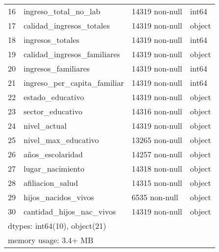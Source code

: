 \documentclass[a4paper]{article}
\begin{document}
\begin{table}[H]
\begin{center}
\begin{tabular}{clll}
    16 & ingreso\_total\_no\_lab        & 14319 non-null & int64  \\
    17 & calidad\_ingresos\_totales    & 14319 non-null & object \\
    18 & ingresos\_totales            & 14319 non-null & int64  \\
    19 & calidad\_ingresos\_familiares & 14319 non-null & object \\
    20 & ingresos\_familiares         & 14319 non-null & int64  \\
    21 & ingreso\_per\_capita\_familiar & 14319 non-null & int64  \\
    22 & estado\_educativo            & 14319 non-null & object \\
    23 & sector\_educativo            & 14316 non-null & object \\
    24 & nivel\_actual                & 14319 non-null & object \\
    25 & nivel\_max\_educativo         & 13265 non-null & object \\
    26 & años\_escolaridad            & 14257 non-null & object \\
    27 & lugar\_nacimiento            & 14318 non-null & object \\
    28 & afiliacion\_salud            & 14315 non-null & object \\
    29 & hijos\_nacidos\_vivos         & 6535 non-null  & object \\
    30 & cantidad\_hijos\_nac\_vivos    & 14319 non-null & object \\
    \multicolumn{4}{l}{dtypes: int64(10), object(21)}  \\
    \multicolumn{4}{l}{memory usage: 3.4+ MB} \\
    \end{tabular}\end{center}
    \end{table}
       
\end{document}
